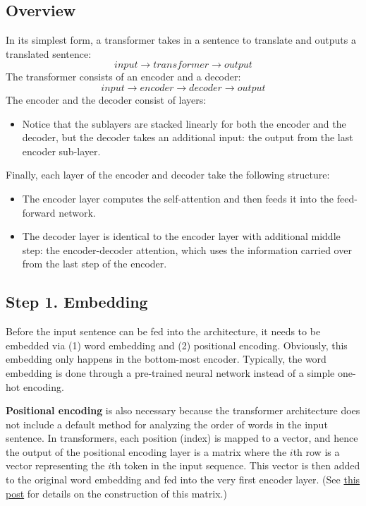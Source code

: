 \documentclass[
]{book}
\providecommand{\tightlist}{%
  \setlength{\itemsep}{0pt}\setlength{\parskip}{0pt}}
\begin{document}
\hypertarget{overview-1}{%
\subsection{Overview}\label{overview-1}}

In its simplest form, a transformer takes in a sentence to translate and outputs a translated sentence:
\[
input \to transformer \to output
\]
The transformer consists of an encoder and a decoder:
\[
input \to encoder \to decoder \to output
\]
The encoder and the decoder consist of layers:

\begin{itemize}
\tightlist
\item
  Notice that the sublayers are stacked linearly for both the encoder and the decoder, but the decoder takes an additional input: the output from the last encoder sub-layer.
\end{itemize}

Finally, each layer of the encoder and decoder take the following structure:

\begin{itemize}
\tightlist
\item
  The encoder layer computes the self-attention and then feeds it into the feed-forward network.
\item
  The decoder layer is identical to the encoder layer with additional middle step: the encoder-decoder attention, which uses the information carried over from the last step of the encoder.
\end{itemize}

\hypertarget{step-1.-embedding}{%
\subsection{Step 1. Embedding}\label{step-1.-embedding}}

Before the input sentence can be fed into the architecture, it needs to be embedded via (1) word embedding and (2) positional encoding. Obviously, this embedding only happens in the bottom-most encoder. Typically, the word embedding is done through a pre-trained neural network instead of a simple one-hot encoding.

\textbf{Positional encoding} is also necessary because the transformer architecture does not include a default method for analyzing the order of words in the input sentence. In transformers, each position (index) is mapped to a vector, and hence the output of the positional encoding layer is a matrix where the \(i\)th row is a vector representing the \(i\)th token in the input sequence. This vector is then added to the original word embedding and fed into the very first encoder layer. (See \href{https://jalammar.github.io/illustrated-transformer/}{this post} for details on the construction of this matrix.)
\end{document}
